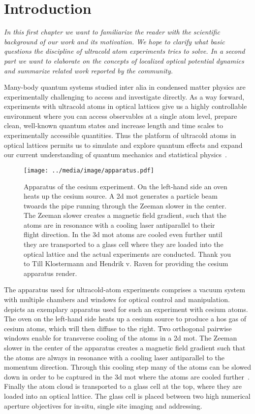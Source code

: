 \chapter{Introduction}\label{ch:introduction}

\textit{In this first chapter we want to familiarize the reader with the
scientific background of our work and its motivation. We hope to clarify what
basic questions the discipline of ultracold atom experiments tries to solve.
In a second part we want to elaborate on the concepts of localized optical
potential dynamics and summarize related work reported by the community.}

Many-body quantum systems studied inter alia in condensed matter physics are
experimentally challenging to access and investigate directly. As a way
forward, experiments with ultracold atoms in optical lattices give us a highly
controllable environment where you can access observables at a single atom
level, prepare clean, well-known quantum states and increase length and time
scales to experimentally accessible quantities. Thus the platform of ultracold
atoms in optical lattices permits us to simulate and explore quantum effects
and expand our current understanding of quantum mechanics and statistical
physics~\cite{Bloch2008,Gross2017}.
\begin{figure}[htb]
  \centering
  \texttt{[image: ../media/image/apparatus.pdf]}
  \caption{Apparatus of the cesium experiment. On the left-hand
    side an oven heats up the cesium source. A \gls{2d} \gls{mot} generates a
    particle beam twoards the pipe running through the Zeeman slower in the
    center. The Zeeman slower creates a magnetic field gradient, such that the
    atoms are in resonance with a cooling laser antiparallel to their flight
    direction. In the \gls{3d} \gls{mot} atoms are cooled even further until
    they are transported to a glass cell where they are loaded into the
    optical lattice and the actual experiments are conducted. Thank you to
    Till Klostermann and Hendrik v. Raven for providing the cesium apparatus
    render.}\label{fig:ultracold_atoms_setup}
\end{figure}
The apparatus used for ultracold-atom experiments comprises a vacuum system
with multiple chambers and windows for optical control and manipulation.
 depicts an exemplary apparatus used
for such an experiment with cesium atoms. The oven on the left-hand side heats
up a cesium source to produce a hos gas of cesium atoms, which will then
diffuse to the right. Two orthogonal pairwise windows enable for transverse
cooling of the atoms in a \gls{2d} \gls{mot}. The Zeeman slower in the center
of the apparatus creates a magnetic field gradient such that the atoms are
always in resonance with a cooling laser antiparallel to the momentum
direction. Through this cooling step many of the atoms can be slowed down in
order to be captured in the \gls{3d} \gls{mot} where the atoms are cooled
further~\cite{Phillips1998}. Finally the atom cloud is transported to a glass
cell at the top, where they are loaded into an optical lattice. The glass
cell is placed between two high numerical aperture objectives for in-situ,
single site imaging and addressing.

